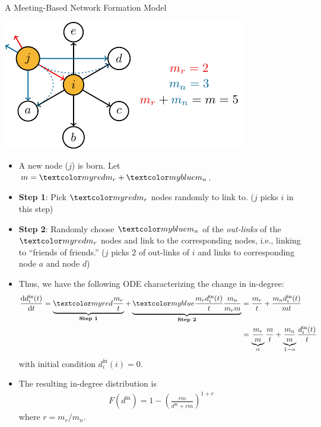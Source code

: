 \documentclass{beamer}
\begin{document}
\begin{frame}{A Meeting-Based Network Formation Model}
	\begin{center}
		\includegraphics[scale=1]{figures-tikz/meeting_basted_network.pdf}
	\end{center}
	\begin{itemize}
		\item
			A new node ($j$) is born.
			Let $m=\red{m_{r}}+\blue{m_{n}}$.
		\item\textbf{Step 1}:
			Pick $\red{m_{r}}$ nodes randomly to link to.
			($j$ picks $i$ in this step)
		\item\textbf{Step 2}:
			Randomly choose $\blue{m_{n}}$ of the \emph{out-links} of the $\red{m_{r}}$ nodes and link to the corresponding nodes,
			i.e., linking to ``friends of friends.''
			($j$ picks $2$ of out-links of $i$ and links to corresponding node $a$ and node $d$)
	\end{itemize}
\end{frame}

\begin{frame}{}
	\begin{itemize}
		\item
			Thus, we have the following ODE characterizing the change in in-degree:
			\begin{align*}
				\D{t}{d_{i}^{\text{in}}(t)}
				= \underbrace{\red{\frac{m_{r}}{t}}}_{\text{\textbf{Step 1}}}
				+ \underbrace{\blue{\frac{m_{r}d_{i}^{\text{in}}(t)}{t} \frac{m_{n}}{m_{r}m}}}_{\text{\textbf{Step 2}}}
				&= \frac{m_{r}}{t}
				+ \frac{m_{n}d_{i}^{\text{in}}(t)}{mt} \\
				&= \underbrace{\frac{m_{r}}{m}}_{\alpha} \frac{m}{t}
				+ \underbrace{\frac{m_{n}}{m}}_{1-\alpha} \frac{d_{i}^{\text{in}}(t)}{t}
			\end{align*}
			with initial condition $d_{i}^{\text{in}}(i)=0$.
		\item
			The resulting in-degree distribution is
			\begin{align*}
				F(d^{\text{in}}) = 1 - \left(\frac{rm}{d^{\text{in}}+rm}\right)^{1+r}
			\end{align*}
			where $r=m_r/m_{n}$. \hyperlink{eq:hybrid_cdf}{}
	\end{itemize}
\end{frame}
\end{document}
